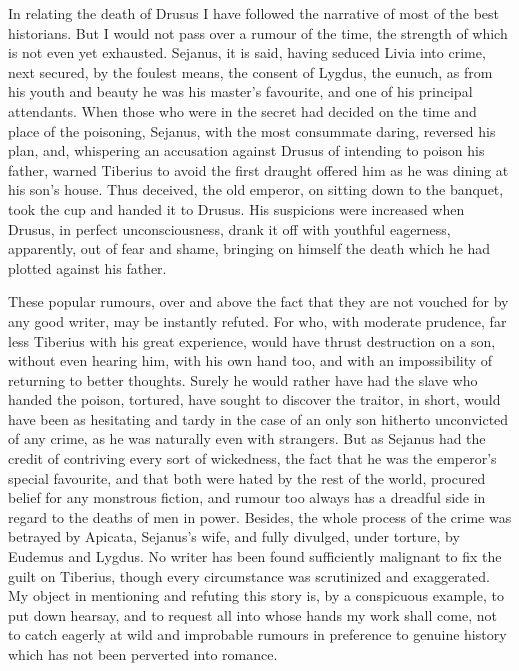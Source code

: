 
In relating the death of Drusus I have followed the narrative of most of the best historians. But I would not pass over a rumour of the time, the strength of which is not even yet exhausted. Sejanus, it is said, having seduced Livia into crime, next secured, by the foulest means, the consent of Lygdus, the eunuch, as from his youth and beauty he was his master's favourite, and one of his principal attendants. When those who were in the secret had decided on the time and place of the poisoning, Sejanus, with the most consummate daring, reversed his plan, and, whispering an accusation against Drusus of intending to poison his father, warned Tiberius to avoid the first draught offered him as he was dining at his son's house. Thus deceived, the old emperor, on sitting down to the banquet, took the cup and handed it to Drusus. His suspicions were increased when Drusus, in perfect unconsciousness, drank it off with youthful eagerness, apparently, out of fear and shame, bringing on himself the death which he had plotted against his father.


These popular rumours, over and above the fact that they are not vouched for by any good writer, may be instantly refuted. For who, with moderate prudence, far less Tiberius with his great experience, would have thrust destruction on a son, without even hearing him, with his own hand too, and with an impossibility of returning to better thoughts. Surely he would rather have had the slave who handed the poison, tortured, have sought to discover the traitor, in short, would have been as hesitating and tardy in the case of an only son hitherto unconvicted of any crime, as he was naturally even with strangers. But as Sejanus had the credit of contriving every sort of wickedness, the fact that he was the emperor's special favourite, and that both were hated by the rest of the world, procured belief for any monstrous fiction, and rumour too always has a dreadful side in regard to the deaths of men in power. Besides, the whole process of the crime was betrayed by Apicata, Sejanus's wife, and fully divulged, under torture, by Eudemus and Lygdus. No writer has been found sufficiently malignant to fix the guilt on Tiberius, though every circumstance was scrutinized and exaggerated. My object in mentioning and refuting this story is, by a conspicuous example, to put down hearsay, and to request all into whose hands my work shall come, not to catch eagerly at wild and improbable rumours in preference to genuine history which has not been perverted into romance.

